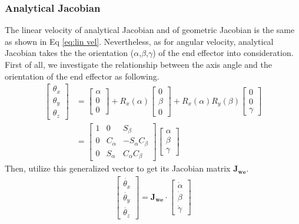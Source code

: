 \subsubsection{Analytical Jacobian}
The linear velocity of analytical Jacobian and of geometric Jacobian is the same as shown in Eq \ref{eq:lin vel}. Nevertheless, as for angular velocity, analytical Jacobian takes the the orientation ($\alpha$,$\beta$,$\gamma$) of the end effector into consideration. First of all, we investigate the relationship between the axis angle and the orientation of the end effector as following.
\begin{equation}
\begin{split}
\begin{bmatrix}
\theta _x \\ 
\theta _y \\ 
\theta _z
\end{bmatrix}
&=
\begin{bmatrix}
\alpha \\ 
0\\ 
0
\end{bmatrix}
+
R_x(\alpha)
\begin{bmatrix}
0 \\ 
\beta \\ 
0
\end{bmatrix}
+
R_x(\alpha)R_y(\beta)
\begin{bmatrix}
0 \\ 
0\\ 
\gamma
\end{bmatrix}\\
&=
\begin{bmatrix}
1 & 0 & S_\beta \\ 
0 & C_\alpha & -S_\alpha C_\beta \\ 
0 & S_\alpha & C_\alpha C_\beta
\end{bmatrix}
\begin{bmatrix}
\alpha \\ 
\beta\\ 
\gamma
\end{bmatrix}
\end{split}
\end{equation}
Then, utilize this generalized vector to get its Jacobian matrix $\mathbf{J_{we}}$.
\begin{equation}
\begin{split}
\begin{bmatrix}
\dot{\theta _x} \\ 
\dot{\theta _y} \\ 
\dot{\theta _z}
\end{bmatrix}
=
\mathbf{J_{\!we}}
\cdot
\begin{bmatrix}
\dot{\alpha} \\ 
\dot{\beta} \\ 
\dot{\gamma}
\end{bmatrix}
\end{split}
\end{equation}
